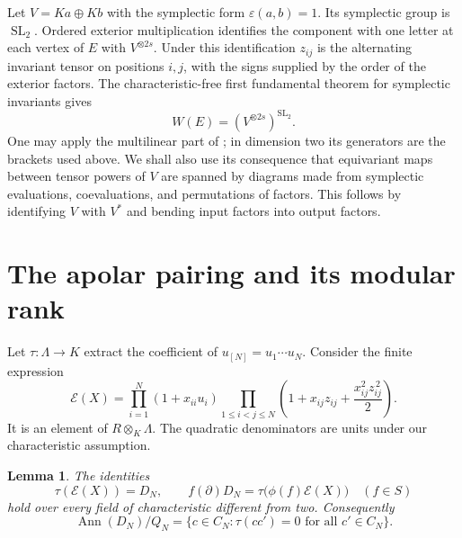 \documentclass[11pt]{article}
\newtheorem{lemma}[theorem]{Lemma}
\theoremstyle{definition}
\theoremstyle{remark}
\numberwithin{equation}{section}
\DeclareMathOperator{\Ann}{Ann}
\DeclareMathOperator{\SL}{SL}
\newcommand{\kk}{K}
\newcommand{\set}[1]{\{#1\}}
\newcommand{\eps}{\varepsilon}
\begin{document}
Let $V=\kk a\oplus\kk b$ with the symplectic form
$\eps(a,b)=1$. Its symplectic group is $\SL_2$. Ordered exterior
multiplication identifies the component with one letter at each vertex
of $E$ with $V^{\otimes 2s}$. Under this identification $z_{ij}$ is the
alternating invariant tensor on positions $i,j$, with the signs supplied
by the order of the exterior factors. The characteristic-free first
fundamental theorem for symplectic invariants gives
\begin{equation}\label{eq:invariants}
 W(E)=(V^{\otimes 2s})^{\SL_2}.
\end{equation}
One may apply the multilinear part of
\cite[Theorem~17]{Hashimoto}; in dimension two its generators are the
brackets used above. We shall also use its consequence that equivariant
maps between tensor powers of $V$ are spanned by diagrams made from
symplectic evaluations, coevaluations, and permutations of factors.
This follows by identifying $V$ with $V^*$ and bending input factors
into output factors.

\section{The apolar pairing and its modular rank}
\label{sec:pairing}

Let $\tau:\Lambda\to\kk$ extract the coefficient of
$u_{[N]}=u_1\cdots u_N$. Consider the finite expression
\begin{equation}\label{eq:exponential}
 \mathcal E(X)=\prod_{i=1}^N(1+x_{ii}u_i)
       \prod_{1\leq i<j\leq N}
           \left(1+x_{ij}z_{ij}+\frac{x_{ij}^2z_{ij}^{\,2}}2\right).
\end{equation}
It is an element of $R\otimes_\kk\Lambda$. The quadratic denominators
are units under our characteristic assumption.

\begin{lemma}\label{lem:top}
The identities
\begin{equation}\label{eq:top}
 \tau(\mathcal E(X))=D_N,\qquad
 f(\partial)D_N=\tau\bigl(\phi(f)\mathcal E(X)\bigr)
       \quad(f\in S)
\end{equation}
hold over every field of characteristic different from two.
Consequently
\begin{equation}\label{eq:radical}
 \Ann(D_N)/Q_N
 =\set{c\in C_N:\tau(cc')=0\text{ for all }c'\in C_N}.
\end{equation}
\end{lemma}
\end{document}
